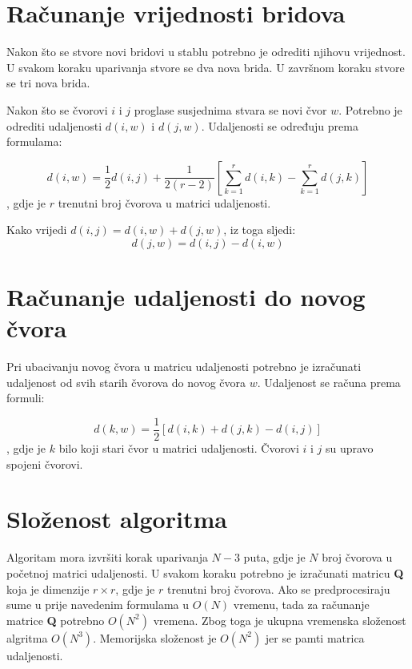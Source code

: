 \documentclass[times, utf8, seminar, numeric]{fer}
\begin{document}
\section{Računanje vrijednosti bridova}

Nakon što se stvore novi bridovi u stablu potrebno je odrediti njihovu vrijednost. U svakom koraku uparivanja stvore se dva nova brida. U završnom koraku stvore se tri nova brida.

Nakon što se čvorovi $i$ i $j$ proglase susjednima stvara se novi čvor $w$. Potrebno je odrediti udaljenosti $d(i, w)$ i $d(j,w)$. Udaljenosti se određuju prema formulama:

\begin{equation}
d(i,w) = \frac{1}{2}d(i,j)+\frac{1}{2(r-2)} \left [ \sum_{k=1}^{r}d(i,k) - \sum_{k=1}^{r}d(j,k) \right ]
\end{equation}
, gdje je $r$ trenutni broj čvorova u matrici udaljenosti.

Kako vrijedi $d(i,j)=d(i,w)+d(j,w)$, iz toga sljedi:
\begin{equation}
d(j,w) = d(i,j) - d(i,w)
\end{equation}

\section{Računanje udaljenosti do novog čvora}

Pri ubacivanju novog čvora u matricu udaljenosti potrebno je izračunati udaljenost od svih starih čvorova do novog čvora $w$. Udaljenost se računa prema formuli: 

\begin{equation}
d(k,w) = \frac{1}{2} \left [ d(i,k) + d(j,k) - d(i,j) \right ]
\end{equation}
, gdje je $k$ bilo koji stari čvor u matrici udaljenosti. Čvorovi $i$ i $j$ su upravo spojeni čvorovi. 

\section{Složenost algoritma}

Algoritam mora izvršiti korak uparivanja $N-3$ puta, gdje je $N$ broj čvorova u početnoj matrici udaljenosti. U svakom koraku potrebno je izračunati matricu \textbf{Q} koja je dimenzije $r\times r$, gdje je $r$ trenutni broj čvorova. Ako se predprocesiraju sume u prije navedenim formulama u $O(N)$ vremenu, tada za računanje matrice \textbf{Q} potrebno $O(N^2)$ vremena. Zbog toga je ukupna vremenska složenost algritma $O(N^3)$. Memorijska složenost je $O(N^2)$ jer se pamti matrica udaljenosti.
\end{document}
